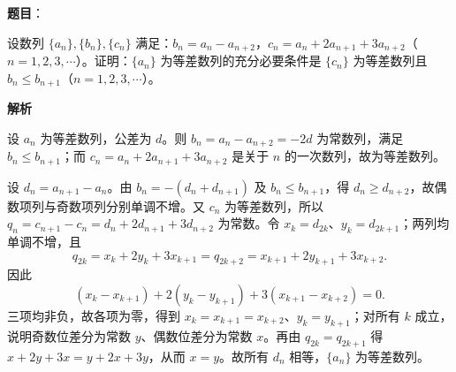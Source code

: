 \begin{answer}

\textbf{题目}：

设数列 $\{a_n\},\{b_n\},\{c_n\}$ 满足：$b_n=a_n-a_{n+2}$，$c_n=a_n+2a_{n+1}+3a_{n+2}$（$n=1,2,3,\cdots$）。证明：$\{a_n\}$ 为等差数列的充分必要条件是 $\{c_n\}$ 为等差数列且 $b_n\leqslant b_{n+1}$（$n=1,2,3,\cdots$）。

\textbf{解析}


设 $a_n$ 为等差数列，公差为 $d$。则 $b_n=a_n-a_{n+2}=-2d$ 为常数列，满足 $b_n\le b_{n+1}$；而 $c_n=a_n+2a_{n+1}+3a_{n+2}$ 是关于 $n$ 的一次数列，故为等差数列。


设 $d_n=a_{n+1}-a_n$。由 $b_n=-(d_n+d_{n+1})$ 及 $b_n\le b_{n+1}$，得 $d_n\ge d_{n+2}$，故偶数项列与奇数项列分别单调不增。又 $c_n$ 为等差数列，所以 $q_n=c_{n+1}-c_n=d_n+2d_{n+1}+3d_{n+2}$ 为常数。令 $x_k=d_{2k}$、$y_k=d_{2k+1}$；两列均单调不增，且
\nopagebreak[4]
\[
q_{2k}=x_k+2y_k+3x_{k+1}=q_{2k+2}=x_{k+1}+2y_{k+1}+3x_{k+2}.
\]
因此
\nopagebreak[4]
\[
(x_k-x_{k+1})+2(y_k-y_{k+1})+3(x_{k+1}-x_{k+2})=0.
\]
三项均非负，故各项为零，得到 $x_k=x_{k+1}=x_{k+2}$、$y_k=y_{k+1}$；对所有 $k$ 成立，说明奇数位差分为常数 $y$、偶数位差分为常数 $x$。再由 $q_{2k}=q_{2k+1}$ 得 $x+2y+3x=y+2x+3y$，从而 $x=y$。故所有 $d_n$ 相等，$\{a_n\}$ 为等差数列。


\end{answer}